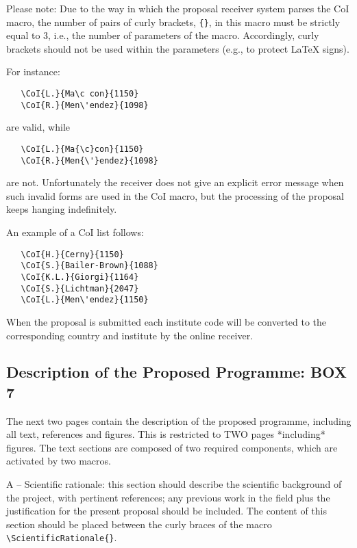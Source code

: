 \documentclass{article}
\begin{document}
Please note: Due to the way in which the proposal receiver system parses
the CoI macro, the number of pairs of curly brackets, \verb|{}|,
in this macro must be strictly equal to 3, i.e., the
number of parameters of the macro. Accordingly, curly
brackets should not be used within the parameters (e.g.,
to protect LaTeX signs).

\noindent
For instance:
\begin{verbatim}
   \CoI{L.}{Ma\c con}{1150}
   \CoI{R.}{Men\'endez}{1098}
\end{verbatim}

\noindent
are valid, while

\begin{verbatim}
   \CoI{L.}{Ma{\c}con}{1150}
   \CoI{R.}{Men{\'}endez}{1098}
\end{verbatim}

\noindent
are not. Unfortunately the receiver does not give an
explicit error message when such invalid forms are
used in the CoI macro, but the processing of the proposal
keeps hanging indefinitely.

\vspace{0.5cm}
An example of a CoI list follows:
\begin{verbatim}
   \CoI{H.}{Cerny}{1150}
   \CoI{S.}{Bailer-Brown}{1088}
   \CoI{K.L.}{Giorgi}{1164}
   \CoI{S.}{Lichtman}{2047}
   \CoI{L.}{Men\'endez}{1150}
\end{verbatim}

When the proposal is submitted each institute code will be converted to the
corresponding country and institute by the online receiver.


\subsection{Description of the Proposed Programme: {\bf BOX 7}}

The next two pages contain the description of the proposed programme,
including all text, references and figures.
This is restricted to TWO pages *including* figures. The
text sections are composed of two required components, which are 
activated by two macros.

A -- Scientific rationale: this section should describe the scientific
background of the project, with pertinent references; any previous
work in the field plus the justification for the present proposal
should be included.  The content of this section should be placed
between the curly braces of the macro \verb|\ScientificRationale{}|. 
\end{document}
